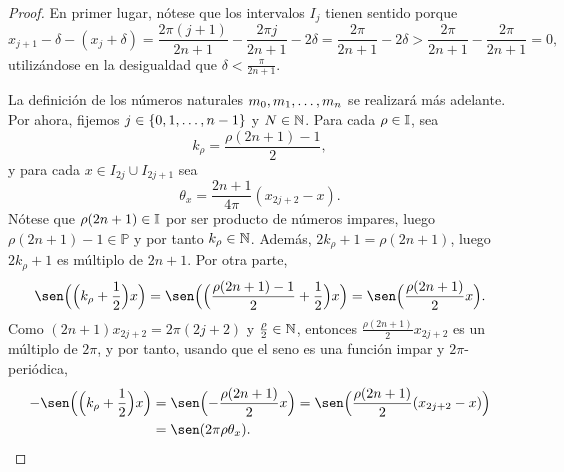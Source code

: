 \documentclass[a4paper, 12pt, oneside]{book}
\begin{document}
\begin{proof}
    En primer lugar, nótese que los intervalos $I_j$ tienen sentido porque
    \[x_{j+1}-\delta -(x_j+\delta) = \frac{2\pi(j+1)}{2n+1}-\frac{2\pi j}{2n+1} -2\delta = \frac{2\pi}{2n+1}-2\delta > \frac{2\pi}{2n+1}-\frac{2\pi}{2n+1} = 0,\]
    utilizándose en la desigualdad que $\delta < \frac{\pi}{2n+1}$.

    La definición de los números naturales $m_0,m_1,\mathellipsis,m_n$ se realizará más adelante. Por ahora, fijemos $j \in \{0,1,\mathellipsis,n-1\}$ y $N \in \mathbb N$. Para cada $\rho \in \mathbb I$, sea \[k_\rho = \frac{\rho(2n+1)-1}{2},\]
    y para cada $x \in I_{2j} \cup I_{2j+1}$ sea
    \[\theta_x = \frac{2n+1}{4\pi}(x_{2j+2}-x).\]
    Nótese que $\rho(2n+1) \in \mathbb I$ por ser producto de números impares, luego $\rho(2n+1)-1 \in \mathbb{P}$ y por tanto $k_\rho \in \mathbb N$. Además, $2k_\rho+1=\rho(2n+1)$, luego $2k_\rho+1$ es múltiplo de $2n+1$. Por otra parte,
    \[\sen\Bigl(\Bigl(k_\rho+\frac{1}{2}\Bigr)x\Bigr) = \sen\Bigl(\Bigl(\frac{\rho(2n+1)-1}{2}+\frac{1}{2}\Bigr)x\Bigr) = \sen\Bigl(\frac{\rho(2n+1)}{2}x\Bigr).\]
    Como $(2n+1)x_{2j+2} = 2\pi(2j+2)$ y $\frac{\rho}{2} \in \mathbb N$, entonces $\frac{\rho(2n+1)}{2}x_{2j+2}$ es un múltiplo de $2\pi$, y por tanto, usando que el seno es una función impar y $2\pi$-periódica,
    \begin{align}\label{2.2.10}
        -\sen\Bigl(\Bigl(k_\rho+\frac{1}{2}\Bigr)x\Bigr) &= \sen\Bigl(-\frac{\rho(2n+1)}{2}x\Bigr) = \sen\Bigl(\frac{\rho(2n+1)}{2}(x_{2j+2}-x)\Bigr) \notag \\ 
        &= \sen(2\pi \rho\theta_x).
    \end{align}
    

\end{proof}
\end{document}
